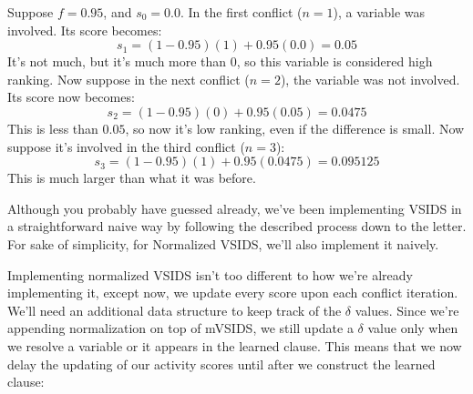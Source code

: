 \begin{center}
    Suppose $f = 0.95$, and $s_0 = 0.0$. In the first conflict ($n = 1$),
    a variable was involved. Its score becomes:
    $$s_1 = (1 - 0.95)(1) + 0.95(0.0) = 0.05$$
    It's not much, but it's much more than 0, so this variable is considered 
    high ranking. Now suppose in the next conflict ($n = 2$), the variable was 
    not involved. Its score now becomes:
    $$s_2 = (1 - 0.95)(0) + 0.95(0.05) = 0.0475$$
    This is less than $0.05$, so now it's low ranking, even if the difference is small.
    Now suppose it's involved in the third conflict ($n = 3$):
    $$s_3 = (1 - 0.95)(1) + 0.95(0.0475) = 0.095125$$
    This is much larger than what it was before.
\end{center}

Although you probably have guessed already, we've been implementing VSIDS 
in a straightforward naive way by following the described process down to the letter. 
For sake of simplicity, for Normalized VSIDS, we'll also implement it naively.

Implementing normalized VSIDS isn't too different to how we're already implementing it,
except now, we update every score upon each conflict iteration. We'll need an additional 
data structure to keep track of the $\delta$ values. Since we're appending normalization 
on top of mVSIDS, we still update a $\delta$ value only when we resolve a variable or it 
appears in the learned clause. This means that we now delay the updating of our activity 
scores until after we construct the learned clause:

